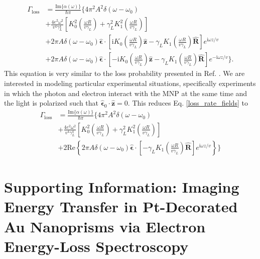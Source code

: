 \documentclass [11pt, proquest] {uwthesis}[2016/11/22]
\begin{document}
\begin{equation}
\begin{aligned}
\Gamma_{\textrm{loss}} &= \frac{\textrm{Im}\{\alpha(\omega)\}}{\hbar\pi}\Big\{4\pi^2A^2\delta(\omega-\omega_0)\\
&+ \frac{4e^2\omega^2}{v^4\gamma_L^4}\left[K_0^2\left(\frac{\omega R}{v\gamma_L}\right) + \gamma_L^2 K_1^2\left(\frac{\omega R}{v\gamma_L}\right)\right]\\
&+ 2\pi A\delta(\omega-\omega_0)\hat{\boldsymbol{\epsilon}}\cdot\left[ \textrm{i}K_0\left( \frac{\omega R}{v\gamma_L} \right)\hat{\textbf{z}} - \gamma_L K_1\left( \frac{\omega R}{v\gamma_L} \right)\hat{\textbf{R}}\right]e^{\textrm{i}\omega z/v}\\
&+ 2\pi A\delta(\omega-\omega_0)\hat{\boldsymbol{\epsilon}}\cdot\left[ -\textrm{i}K_0\left( \frac{\omega R}{v\gamma_L} \right)\hat{\textbf{z}} - \gamma_L K_1\left( \frac{\omega R}{v\gamma_L} \right)\hat{\textbf{R}}\right]e^{-\textrm{i}\omega z/v} \Big\}.
\label{loss_rate_fields}
\end{aligned}
\end{equation}
This equation is very similar to the loss probability presented in Ref. \cite{vanAiken}. We are interested in modeling particular experimental situations, specifically experiments in which the photon and electron interact with the MNP at the same time and the light is polarized such that $\hat{\boldsymbol{\epsilon}}_0 \cdot \hat{\textbf{z}} = 0$. This reduces Eq. \ref{loss_rate_fields} to
\begin{equation}
\begin{aligned}
\Gamma_{\textrm{loss}} &= \frac{\textrm{Im}\{\alpha(\omega)\}}{\hbar\pi}\Big\{4\pi^2A^2\delta(\omega-\omega_0)\\
&+ \frac{4e^2\omega^2}{v^4\gamma_L^4}\left[K_0^2\left(\frac{\omega R}{v\gamma_L}\right) + \gamma_L^2 K_1^2\left(\frac{\omega R}{v\gamma_L}\right)\right]\\
&+ 2\textrm{Re}\left\{2\pi A\delta(\omega-\omega_0)\hat{\boldsymbol{\epsilon}}\cdot\left[ -\gamma_L K_1\left( \frac{\omega R}{v\gamma_L} \right)\hat{\textbf{R}}\right]e^{\textrm{i}\omega z/v}\right\}\Big\}
\label{loss_fields_realpart}
\end{aligned}
\end{equation}

%
\appendix
\raggedbottom\sloppy
 
\chapter{Supporting Information: Imaging Energy Transfer in Pt-Decorated Au Nanoprisms via Electron Energy-Loss Spectroscopy}
\end{document}
